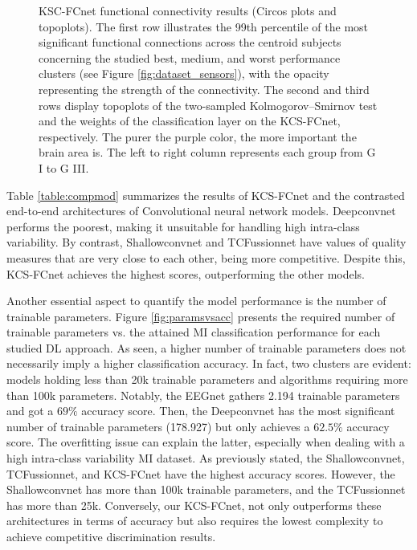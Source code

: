 \begin{figure}
\begin{subfigure}[b]{\linewidth}
    \end{subfigure}
    \caption{KSC-FCnet functional connectivity results (Circos plots and topoplots). The first row illustrates the 99th percentile of the most significant functional connections across the centroid subjects concerning the studied best, medium, and worst performance clusters (see Figure \ref{fig:dataset_sensors}), with the opacity representing the strength of the connectivity. The second and third rows display topoplots of the two-sampled Kolmogorov--Smirnov test and the weights of the classification layer on the KCS-FCnet, respectively. The purer the purple color, the more important the brain area is. The left to right column represents each group from G I to G III.}
    \label{fig:topoplot_graphs}
\end{figure}

Table \ref{table:compmod} summarizes the results of KCS-FCnet and the contrasted end-to-end architectures of Convolutional neural network models. Deepconvnet performs the poorest, making it unsuitable for handling high intra-class variability. By contrast, Shallowconvnet and TCFussionnet have values of quality measures that are very close to each other, being more competitive. Despite this, KCS-FCnet achieves the highest scores, outperforming the other models.


Another essential aspect to quantify the model performance is the number of trainable parameters. Figure \ref{fig:paramsvsacc} presents the required number of trainable parameters vs. the attained MI classification performance for each studied DL approach. As seen, a higher number of trainable parameters does not necessarily imply a higher classification accuracy. In fact, two clusters are evident: models holding less than 20k trainable parameters and algorithms requiring more than 100k parameters. Notably, the EEGnet gathers 2.194 trainable parameters and got a $69\%$ accuracy score. Then,  the Deepconvnet has the most significant number of trainable parameters (178.927) but only achieves a $62.5\%$ accuracy score. The overfitting issue can explain the latter, especially when dealing with a high intra-class variability MI dataset. As previously stated, the Shallowconvnet, TCFussionnet, and KCS-FCnet have the highest accuracy scores. However, the Shallowconvnet has more than 100k trainable parameters, and the TCFussionnet has more than 25k. Conversely, our KCS-FCnet, not only outperforms these architectures in terms of accuracy but also requires the lowest complexity to achieve competitive discrimination results.

